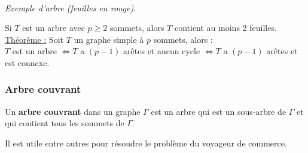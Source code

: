 \documentclass[11pt]{article}
\begin{document}
        			\begin{center}
        			 \\
        			\textit{Exemple d'arbre (feuilles en rouge).}
        			\end{center}
        	
        			Si $T$ est un arbre avec $p \geq 2$ sommets, alors $T$ contient au moins 2 feuilles.\\
        				
        			\underline{Théorème :} Soit $T$ un graphe simple à $p$ sommets, alors : \\ 
        			$T$ est un arbre $\Leftrightarrow T$ a $(p-1)$ arêtes et aucun cycle $\Leftrightarrow T$ a $(p-1)$ arêtes et est connexe.
		\subsubsection{Arbre couvrant}
			Un \textbf{arbre couvrant} dans un graphe $\Gamma$ est un arbre qui est un sous-arbre de $\Gamma$ et qui contient tous les sommets de $\Gamma$.
			
			Il est utile entre autres pour résoudre le problème du voyageur de commerce.
	
\end{document}
